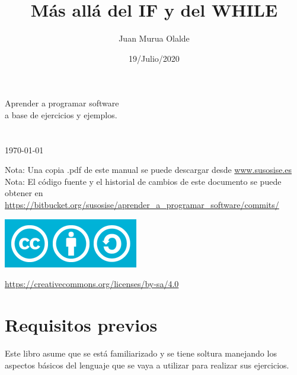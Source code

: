 \documentclass[spanish,12pt,a4paper,final,oneside]{book}
\title{Más allá del IF y del WHILE}
\author{Juan Murua Olalde}
\date{19/Julio/2020}
\begin{document}
\begin{titlepage}

\begin{flushright}
\vspace{2cm}
\begin{Huge}\MyTitle\end{Huge}

Aprender a programar software\\ a base de ejercicios y ejemplos.
\\
\vspace{1cm}
\MyAuthor
\\
\vspace{1cm}
\MyDate
\\ \today
\\
\end{flushright}

\vfill
Nota: Una copia .pdf de este manual se puede descargar desde \url{www.susosise.es}
\\Nota: El código fuente y el historial de cambios de este documento se puede obtener en  \\ \url{https://bitbucket.org/susosise/aprender_a_programar_software/commits/}
\begin{flushleft}
\includegraphics[scale=0.3]{CreativeCommons-Attribution-ShareAlike-logo}
\begin{small}\url{https://creativecommons.org/licenses/by-sa/4.0}\end{small}
\end{flushleft}

\end{titlepage}

\hypersetup{linkcolor=black}
\tableofcontents


\chapter*{Requisitos previos}
Este libro asume que se está familiarizado y se tiene soltura manejando los aspectos básicos del lenguaje que se vaya a utilizar para realizar sus ejercicios.
\end{document}
